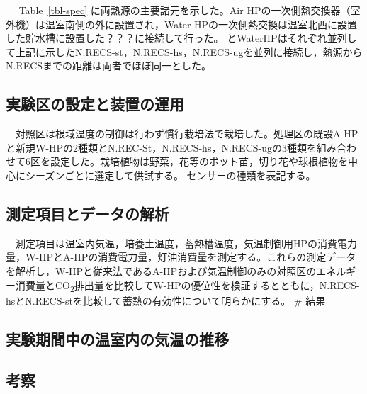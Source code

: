 \documentclass[
  japanese,
  11pt,
  letterpaper,
  DIV=11,
  numbers=noendperiod]{scrartcl}
\begin{document}
　 Table~\ref{tbl-spec} に両熱源の主要諸元を示した。Air
HPの一次側熱交換器（室外機）は温室南側の外に設置され，Water
HPの一次側熱交換は温室北西に設置した貯水槽に設置した？？？に接続して行った。
とWaterHPはそれぞれ並列して上記に示したN.RECS-st，N.RECS-hs，N.RECS-ugを並列に接続し，熱源からN.RECSまでの距離は両者でほぼ同一とした。

\begin{table}[H]

\caption{\label{tbl-spec}熱源の諸元}


\end{table}%

\subsection{実験区の設定と装置の運用}\label{ux5b9fux9a13ux533aux306eux8a2dux5b9aux3068ux88c5ux7f6eux306eux904bux7528}

　対照区は根域温度の制御は行わず慣行栽培法で栽培した。処理区の既設A-HPと新規W-HPの2種類とN.REC-St，N.RECS-hs，N.RECS-ugの3種類を組み合わせて6区を設定した。栽培植物は野菜，花等のポット苗，切り花や球根植物を中心にシーズンごとに選定して供試する。
センサーの種類を表記する。

\subsection{測定項目とデータの解析}\label{ux6e2cux5b9aux9805ux76eeux3068ux30c7ux30fcux30bfux306eux89e3ux6790}

　測定項目は温室内気温，培養土温度，蓄熱槽温度，気温制御用HPの消費電力量，W-HPとA-HPの消費電力量，灯油消費量を測定する。これらの測定データを解析し，W-HPと従来法であるA-HPおよび気温制御のみの対照区のエネルギー消費量とCO\textsubscript{2}排出量を比較してW-HPの優位性を検証するとともに，N.RECS-hsとN.RECS-stを比較して蓄熱の有効性について明らかにする。
\# 結果

\subsection{実験期間中の温室内の気温の推移}\label{ux5b9fux9a13ux671fux9593ux4e2dux306eux6e29ux5ba4ux5185ux306eux6c17ux6e29ux306eux63a8ux79fb}

\subsection{考察}\label{ux8003ux5bdf}
\end{document}
